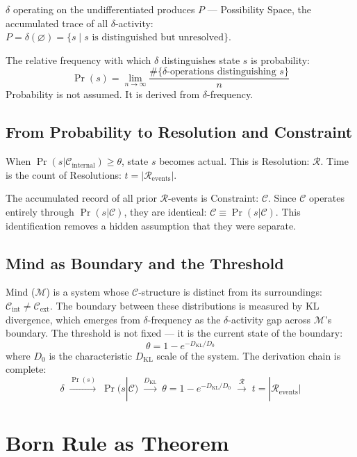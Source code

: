\documentclass[12pt]{article}
\begin{document}
$\delta$ operating on the undifferentiated produces $P$ ---
Possibility Space, the accumulated trace of all $\delta$-activity:
$P = \delta(\varnothing) = \{s \mid s\text{ is distinguished but
unresolved}\}$.

The relative frequency with which $\delta$ distinguishes state $s$
is probability:
\[
  \Pr(s) = \lim_{n\to\infty}
  \frac{\#\{\delta\text{-operations distinguishing }s\}}{n}
\]
Probability is not assumed. It is derived from $\delta$-frequency.

\subsection{From Probability to Resolution and Constraint}

When $\Pr(s|\mathcal{C}_{\mathrm{internal}}) \geq \theta$, state $s$
becomes actual. This is Resolution: $\mathcal{R}$. Time is the count
of Resolutions: $t = |\mathcal{R}_{\mathrm{events}}|$.

The accumulated record of all prior $\mathcal{R}$-events is
Constraint: $\mathcal{C}$. Since $\mathcal{C}$ operates entirely
through $\Pr(s|\mathcal{C})$, they are identical:
$\mathcal{C} \equiv \Pr(s|\mathcal{C})$. This identification removes
a hidden assumption that they were separate.

\subsection{Mind as Boundary and the Threshold}

Mind ($\mathcal{M}$) is a system whose $\mathcal{C}$-structure is
distinct from its surroundings:
$\mathcal{C}_{\mathrm{int}} \neq \mathcal{C}_{\mathrm{ext}}$. The
boundary between these distributions is measured by KL divergence,
which emerges from $\delta$-frequency as the $\delta$-activity gap
across $\mathcal{M}$'s boundary. The threshold is not fixed --- it
is the current state of the boundary:
\[
  \theta = 1 - e^{-D_{\mathrm{KL}}/D_0}
\]
where $D_0$ is the characteristic $D_{\mathrm{KL}}$ scale of the
system. The derivation chain is complete:
\[
  \delta \;\xrightarrow{\Pr(s)}\; \Pr(s|\mathcal{C})
  \;\xrightarrow{D_{\mathrm{KL}}}\;
  \theta = 1 - e^{-D_{\mathrm{KL}}/D_0}
  \;\xrightarrow{\mathcal{R}}\;
  t = |\mathcal{R}_{\mathrm{events}}|
\]

\section{Born Rule as Theorem}
\end{document}
